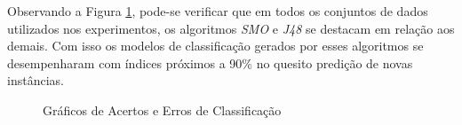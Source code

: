 \documentclass[
	12pt,				%
	openright,			%
	oneside,	
	a4paper,				%
	english,				%
	brazil				%
]{abntex2/abntex2} %
\begin{document}
	
	Observando a Figura \ref{figAcertosErrosClassificacao}, pode-se verificar que em todos os conjuntos de dados utilizados nos experimentos, os algoritmos \textit{SMO} e \textit{J48} se destacam em relação aos demais. Com isso os modelos de classificação gerados por esses algoritmos se desempenharam com índices próximos a 90\% no quesito predição de novas instâncias.
	
	\begin{figure}[!htb]
		\begin{center}
			\caption{\label{figAcertosErrosClassificacao} Gráficos de Acertos e Erros de Classificação}
		\end{center}
\end{figure}
\end{document}
